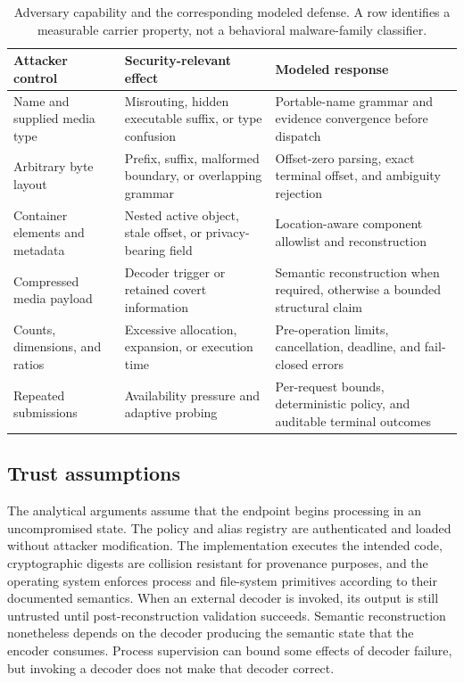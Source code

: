 \begin{table}[t]
\centering
\caption{Adversary capability and the corresponding modeled defense. A row
identifies a measurable carrier property, not a behavioral malware-family
classifier.}
\label{tab:adversary-capabilities}
\small
\begin{tabularx}{\textwidth}{L{0.24\textwidth}YY}
\toprule
Attacker control & Security-relevant effect & Modeled response \\
\midrule
Name and supplied media type & Misrouting, hidden executable suffix, or type
confusion & Portable-name grammar and evidence convergence before dispatch \\
Arbitrary byte layout & Prefix, suffix, malformed boundary, or overlapping
grammar & Offset-zero parsing, exact terminal offset, and ambiguity rejection \\
Container elements and metadata & Nested active object, stale offset, or
privacy-bearing field & Location-aware component allowlist and reconstruction \\
Compressed media payload & Decoder trigger or retained covert information &
Semantic reconstruction when required, otherwise a bounded structural claim \\
Counts, dimensions, and ratios & Excessive allocation, expansion, or execution
time & Pre-operation limits, cancellation, deadline, and fail-closed errors \\
Repeated submissions & Availability pressure and adaptive probing & Per-request
bounds, deterministic policy, and auditable terminal outcomes \\
\bottomrule
\end{tabularx}
\end{table}

\subsection{Trust assumptions}

The analytical arguments assume that the endpoint begins processing in an
uncompromised state. The policy and alias registry are authenticated and loaded
without attacker modification. The implementation executes the intended code,
cryptographic digests are collision resistant for provenance purposes, and the
operating system enforces process and file-system primitives according to their
documented semantics. When an external decoder is invoked, its output is still
untrusted until post-reconstruction validation succeeds. Semantic
reconstruction nonetheless depends on the decoder producing the semantic state
that the encoder consumes. Process supervision can bound some effects of decoder failure,
but invoking a decoder does not make that decoder correct.

